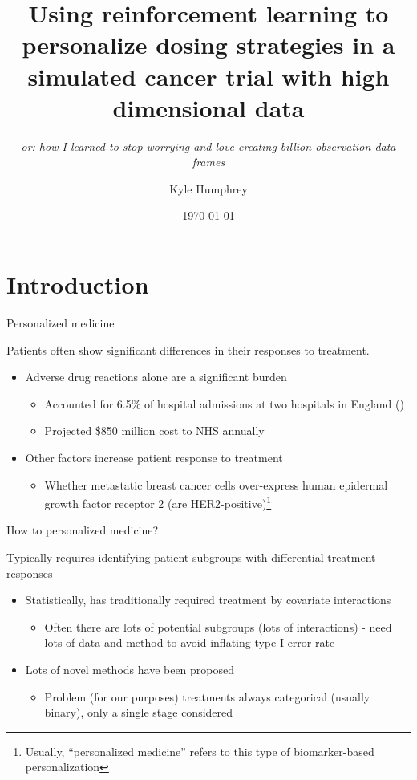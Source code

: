 \documentclass[handout]{beamer}
\title{Using reinforcement learning to personalize dosing strategies in a simulated cancer trial with high dimensional data}
\subtitle{\sl or: how I learned to stop worrying and love creating billion-observation data frames}
\date{\today}
\author{Kyle Humphrey}
\institute{University of Arizona}
\begin{document}
\maketitle


\section{Introduction}

\begin{frame}{Personalized medicine}

Patients often show significant differences in their responses to treatment.
\begin{itemize}[<+->]
  \item Adverse drug reactions alone are a significant burden 
  \begin{itemize}
    \item Accounted for 6.5\% of hospital admissions at two hospitals in England  (\cite{Pirmohamed2004})
    \item Projected \$850 million cost to NHS annually 
  \end{itemize}
  \item Other factors increase patient response to treatment
  \begin{itemize}
    \item Whether metastatic breast cancer cells over-express human epidermal growth factor receptor 2 (are HER2-positive)\footnote{Usually, ``personalized medicine'' refers to this type of biomarker-based personalization}
  \end{itemize}
\end{itemize}

\end{frame}

\begin{frame}[c]{How to personalized medicine?}

Typically requires identifying patient subgroups with differential treatment responses
\begin{itemize}[<+->]
  \item Statistically, has traditionally required treatment by covariate interactions
  \begin{itemize}
    \item Often there are lots of potential subgroups (lots of interactions) - need lots of data and method to avoid inflating type I error rate
  \end{itemize}
  \item Lots of novel methods have been proposed
  \begin{itemize}
    \item Problem (for our purposes) treatments always categorical (usually binary), only a single stage considered
  \end{itemize}
\end{itemize}

\end{frame}
\end{document}
